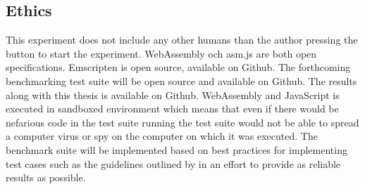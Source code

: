 





\subsection{Ethics}

This experiment does not include any other humans than the author pressing the button to start the experiment. WebAssembly och asm.js are both open specifications. Emscripten is open source, available on Github. The forthcoming benchmarking test suite will be open source and available on Github. The results along with this thesis is available on Github. WebAssembly and JavaScript is executed in sandboxed environment which means that even if there would be nefarious code in the test suite running the test suite would not be able to spread a computer virus or spy on the computer on which it was executed. The benchmark suite will be implemented based on best practices for implementing test cases such as the guidelines outlined by \textcite{CaiNerurkarWu1998} in an effort to provide as reliable results as possible.


